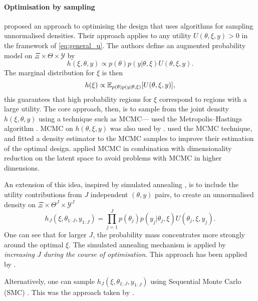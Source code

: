 \documentclass[a4paper, 10pt]{report}
\theoremstyle{plain}
\begin{document}
	\paragraph{Optimisation by sampling}
	\citet{clyde1996exploring} proposed an approach to optimising the design that uses algorithms for sampling unnormalised densities.
	Their approach applies to any utility $U(\theta,\xi,y) > 0$ in the framework of \eqref{eq:general_u}.
	The authors define an augmented probability model on $\Xi \times \Theta \times \mathcal{Y}$ by
	\begin{equation}
	\label{eq:optim_mcmc}
	h(\xi,\theta,y) \propto p(\theta)p(y|\theta,\xi)U(\theta,\xi,y).
	\end{equation}
	The marginal distribution for $\xi$ is then
	\begin{equation}
	h(\xi) \propto \mathbb{E}_{p(\theta)p(y|\theta,\xi)}[U(\theta,\xi,y)],
	\end{equation}
	this guarantees that high probability regions for $\xi$ correspond to regions with a large utility.
	The core approach, then, is to sample from the joint density $h(\xi,\theta,y)$ using a technique such as MCMC---\citet{clyde1996exploring} used the Metropolis--Hastings algorithm \citep{hastings1970monte}.
	MCMC on $h(\theta,\xi,y)$ was also used by \citet{bielza1999decision,muller2005simulation}.
	\citet{cook2008optimal,drovandi2013bayesian} used the MCMC technique, and fitted a density estimator to the MCMC samples to improve their estimation of the optimal design.
	\citet{ryan2014towards} applied MCMC in combination with dimensionality reduction on the latent space to avoid problems with MCMC in higher dimensions.
	
	An extension of this idea, inspired by simulated annealing \citep{van1987simulated}, is to include the utility contributions from $J$ independent $(\theta, y)$ pairs, to create an unnormalised density on $\Xi \times \Theta^J\times \mathcal{Y}^J$
	\begin{equation}
	\label{eq:optim_mcmc_J}
	h_J(\xi,\theta_{1:J},y_{1:J}) = \prod_{j=1}^J p(\theta_j)p(y_j|\theta_j,\xi)U(\theta_j,\xi,y_j).
	\end{equation}
	One can see that for larger $J$, the probability mass concentrates more strongly around the optimal $\xi$.
	The simulated annealing mechanism is applied by \emph{increasing $J$ during the course of optimisation}.
	This approach has been applied by \citet{muller2004optimal,muller2005simulation,stroud2001optimal,cook2008optimal}.
	
	Alternatively, one can sample $h_J(\xi,\theta_{1:J},y_{1:J})$ using Sequential Monte Carlo (SMC) \citep{doucet2000sequential}.
	This was the approach taken by \citet{amzal2006bayesian,kuck2006smc}.
	
\end{document}
